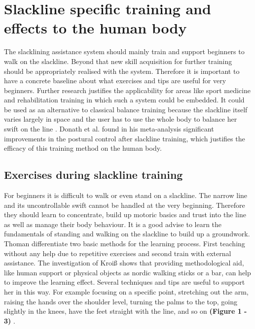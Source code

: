 \section{Slackline specific training and effects to the human body}

The slacklining assistance system should mainly train and support beginners to walk on the slackline. Beyond that new skill acquisition for further training should be appropriately realised with the system. Therefore it is important to have a concrete baseline about what exercises and tips are useful for very beginners.  Further research justifies the applicability for areas like sport medicine and rehabilitation training in which such a system could be embedded. It could be used as an alternative to classical balance training because the slackline itself varies largely in space and the user has to use the whole body to balance her swift on the line \cite{Pfusterschmied2013-yy}. Donath et al. \cite{Donath2016-rt} found in his meta-analysis significant improvements in the postural control after slackline training, which justifies the efficacy of this training method on the human body.

\subsection{Exercises during slackline training}

For beginners it is difficult to walk or even stand on a slackline. The narrow line and its uncontrollable swift cannot be handled at the very beginning. Therefore they should learn to concentrate, build up motoric basics and trust into the line as well as manage their body behaviour. It is a good advise to learn the fundamentals of standing and walking on the slackline to build up a groundwork.
Thoman \cite{Thomann2013-aa} differentiate two basic methods for the learning process. First teaching without any help due to repetitive exercises and second train with external assistance. The investigation of Kroiß\cite{Kroiss2007-ab} shows that providing methodological aid, like human support or physical objects as nordic walking sticks or a bar, can help to improve the learning effect. Several techniques and tips are useful to support her in this way. For example focusing on a specific point, stretching out the arm, raising the hands over the shoulder level, turning the palms to the top, going slightly in the knees, have the feet straight with the line, and so on \textbf{(Figure 1 - 3)} \cite{Kroiss2007-ab} \cite{Kleindl2011-bl}.

